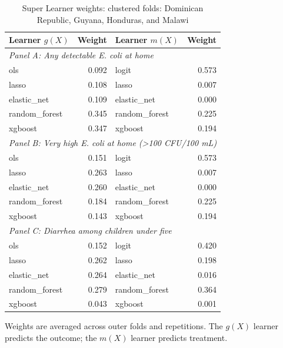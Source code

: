 \begin{table}[htbp]
\centering
\caption{Super Learner weights: clustered folds: Dominican Republic, Guyana, Honduras, and Malawi}
\label{tab:super-learner-weights-clustered-selected-countries}
\small
\begin{tabular}{lrlr}
\toprule
Learner $g(X)$ & Weight & Learner $m(X)$ & Weight \\
\midrule
\multicolumn{4}{l}{\textit{Panel A: Any detectable E. coli at home}} \\
ols & 0.092 & logit & 0.573 \\
lasso & 0.108 & lasso & 0.007 \\
elastic\_net & 0.109 & elastic\_net & 0.000 \\
random\_forest & 0.345 & random\_forest & 0.225 \\
xgboost & 0.347 & xgboost & 0.194 \\
\midrule
\multicolumn{4}{l}{\textit{Panel B: Very high E. coli at home (>100 CFU/100 mL)}} \\
ols & 0.151 & logit & 0.573 \\
lasso & 0.263 & lasso & 0.007 \\
elastic\_net & 0.260 & elastic\_net & 0.000 \\
random\_forest & 0.184 & random\_forest & 0.225 \\
xgboost & 0.143 & xgboost & 0.194 \\
\midrule
\multicolumn{4}{l}{\textit{Panel C: Diarrhea among children under five}} \\
ols & 0.152 & logit & 0.420 \\
lasso & 0.262 & lasso & 0.198 \\
elastic\_net & 0.264 & elastic\_net & 0.016 \\
random\_forest & 0.279 & random\_forest & 0.364 \\
xgboost & 0.043 & xgboost & 0.001 \\
\bottomrule
\end{tabular}
\par\vspace{3pt}
\begin{minipage}{0.9\linewidth}\footnotesize Weights are averaged across outer folds and repetitions. The $g(X)$ learner predicts the outcome; the $m(X)$ learner predicts treatment.\end{minipage}
\end{table}